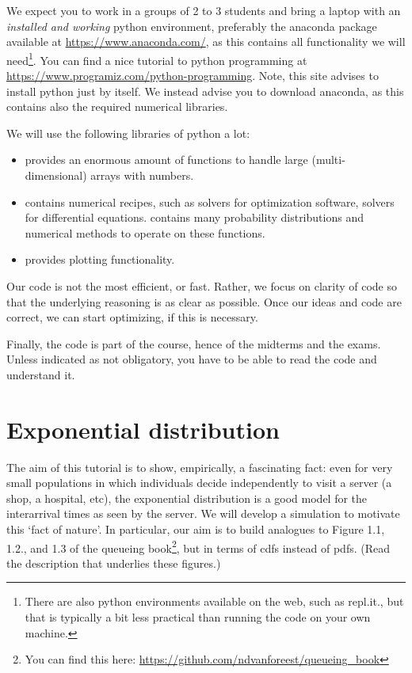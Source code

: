 \documentclass{scrartcl}
\begin{document}
We expect you to work in a groups of 2 to 3 students and bring a laptop with an \emph{installed and working} python environment, preferably  the anaconda package available at \url{https://www.anaconda.com/},  as this contains all functionality we will need\footnote{There are also python environments available on the web, such as repl.it., but that is typically a bit less practical than running the code on your own machine.}. You can find a nice tutorial to python programming at  \url{https://www.programiz.com/python-programming}. Note, this site advises to install python just by itself. We instead advise you to download anaconda, as this contains also the required numerical libraries. 

We will use the following libraries of python a lot:
\begin{itemize}
\item {}  provides an enormous amount of functions to handle large (multi-dimensional) arrays with numbers. 
\item {} contains numerical recipes, such as solvers for optimization software, solvers for differential equations.  contains many probability distributions and numerical methods to operate on these functions. 
\item {} provides plotting functionality.
\end{itemize}

Our code is not the most efficient, or fast.
Rather, we focus on clarity of code so that the underlying reasoning is as clear as possible.
Once our ideas and code are correct, we can start optimizing, if this is necessary.

Finally, the code is part of the course, hence of the midterms and the exams.
Unless indicated as not obligatory, you have to be able to read the code and understand it.


\clearpage
\section{Exponential distribution}

The aim of this tutorial is to show, empirically, a fascinating fact: even for very small populations in which individuals decide independently to visit a server (a shop, a hospital, etc), the exponential distribution is a good model for the interarrival times as seen by the server.
We will develop a simulation to motivate this `fact of nature'.
In particular, our aim is to build analogues to Figure 1.1, 1.2., and 1.3 of the queueing book\footnote{You can find this here: \url{https://github.com/ndvanforeest/queueing_book}}, but in terms of cdfs instead of pdfs.
(Read the description that underlies these figures.)
\end{document}
